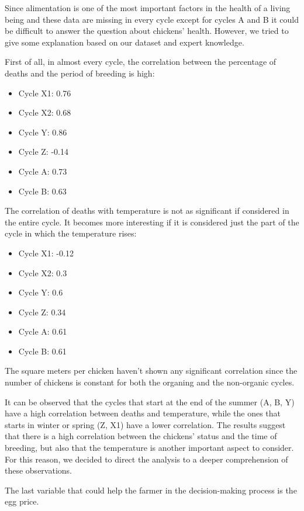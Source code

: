 \documentclass[11pt]{article}
\begin{document}
Since alimentation is one of the most important factors in the health of a living being and these data are missing in every cycle except for cycles A and B it could be difficult to answer the question
about chickens' health.
However, we tried to give some explanation based on our dataset and expert knowledge.

First of all, in almost every cycle, the correlation between the percentage of deaths and the period of breeding is high:
\begin{itemize}
    \item Cycle X1: 0.76
    \item Cycle X2: 0.68
    \item Cycle Y: 0.86 
    \item Cycle Z: -0.14
    \item Cycle A: 0.73
    \item Cycle B: 0.63
\end{itemize}

The correlation of deaths with temperature is not as significant if considered in the entire cycle. It becomes more interesting if it is considered just the part of the cycle in which the temperature rises:
\begin{itemize}
    \item Cycle X1: -0.12
    \item Cycle X2: 0.3
    \item Cycle Y: 0.6
    \item Cycle Z: 0.34
    \item Cycle A: 0.61
    \item Cycle B: 0.61
\end{itemize}

The square meters per chicken haven't shown any significant correlation since the number of chickens is constant for both the organing and the non-organic cycles.

It can be observed that the cycles that start at the end of the summer (A, B, Y) have a high correlation between deaths and temperature, while the ones that
starts in winter or spring (Z, X1) have a lower correlation.
The results suggest that there is a high correlation between the chickens' status and the time of breeding, but also that the temperature is another important aspect
to consider. For this reason, we decided to direct the analysis to a deeper comprehension of these observations.

The last variable that could help the farmer in the decision-making process is the egg price.
\end{document}
